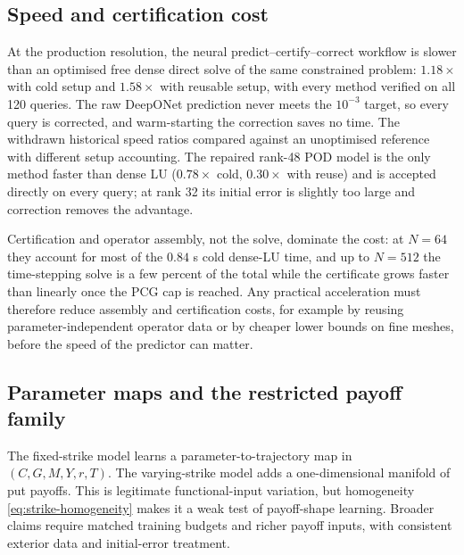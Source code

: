 \documentclass[11pt]{amsart}
\theoremstyle{remark}
\begin{document}
\subsection{Speed and certification cost}
At the production resolution, the neural predict--certify--correct
workflow is slower than an optimised free dense direct solve of the same
constrained problem: $1.18\times$ with cold setup and $1.58\times$ with
reusable setup, with every method verified on all 120 queries. The raw
DeepONet prediction never meets the $10^{-3}$ target, so every query is
corrected, and warm-starting the correction saves no time. The withdrawn
historical speed ratios compared against an unoptimised reference with
different setup accounting. The repaired rank-48 POD model is the only
method faster than dense LU ($0.78\times$ cold, $0.30\times$ with reuse) and
is accepted directly on every query; at rank 32 its initial error is
slightly too large and correction removes the advantage.

Certification and operator assembly, not the solve, dominate the cost: at
$N=64$ they account for most of the $0.84$ s cold dense-LU time, and up to
$N=512$ the time-stepping solve is a few percent of the total while the
certificate grows faster than linearly once the PCG cap is reached. Any
practical acceleration must therefore reduce assembly and certification
costs, for example by reusing parameter-independent operator data or by
cheaper lower bounds on fine meshes, before the speed of the predictor can
matter.

\subsection{Parameter maps and the restricted payoff family}
The fixed-strike model learns a parameter-to-trajectory map in
$(C,G,M,Y,r,T)$. The varying-strike model adds a one-dimensional manifold of
put payoffs. This is legitimate functional-input variation, but homogeneity
\eqref{eq:strike-homogeneity} makes it a weak test of payoff-shape learning.
Broader claims require matched training budgets and richer payoff inputs,
with consistent exterior data and initial-error treatment.
\end{document}
